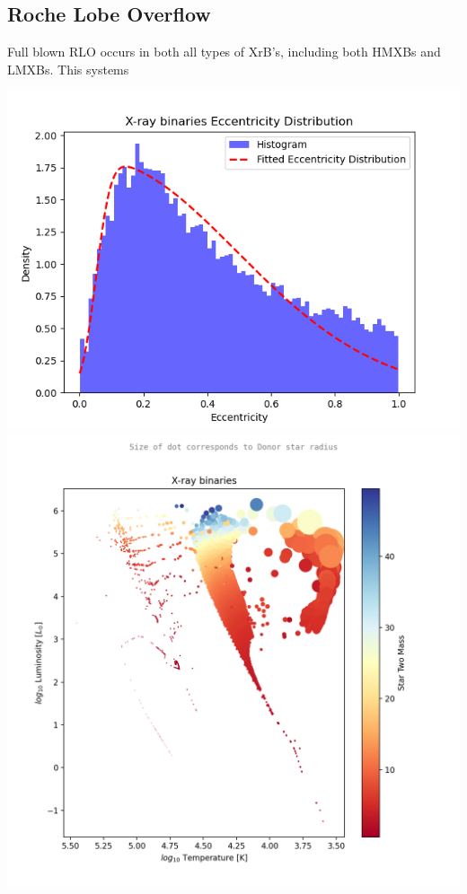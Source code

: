 \documentclass[12pt, letterpaper]{article}
\begin{document}
        \subsection{\centering Roche Lobe Overflow}
        Full blown RLO occurs in both all types of XrB's, including both HMXBs and LMXBs. This systems 
        \begin{center}
            \includegraphics[scale=.5]{Figs/X-ray binaries Eccentricty Distribution.png}
            \includegraphics[scale=.5]{Figs/X-ray binaries S2mass log10 F star radius T.png}

\end{center}
\end{document}
